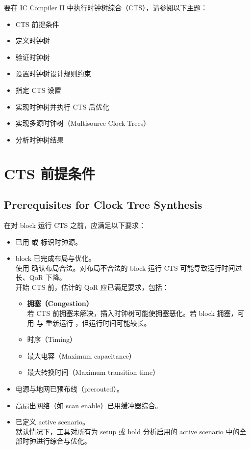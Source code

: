 \label{chap:cts}

要在 IC Compiler II 中执行时钟树综合（CTS），请参阅以下主题：
\begin{itemize}
  \item CTS 前提条件
  \item 定义时钟树
  \item 验证时钟树
  \item 设置时钟树设计规则约束
  \item 指定 CTS 设置
  \item 实现时钟树并执行 CTS 后优化
  \item 实现多源时钟树（Multisource Clock Trees）
  \item 分析时钟树结果
\end{itemize}

\section{CTS 前提条件}
\subsection*{Prerequisites for Clock Tree Synthesis}

在对 block 运行 CTS 之前，应满足以下要求：
\begin{itemize}
  \item 已用  或  标识时钟源。
  \item block 已完成布局与优化。\\
        使用  确认布局合法。对布局不合法的 block 运行 CTS 可能导致运行时间过长、QoR 下降。\\
        开始 CTS 前，估计的 QoR 应已满足要求，包括：
        \begin{itemize}
          \item \textbf{拥塞（Congestion）}\\
                若 CTS 前拥塞未解决，插入时钟树可能使拥塞恶化。若 block 拥塞，可用  与  重新运行 ，但运行时间可能较长。
          \item 时序（Timing）
          \item 最大电容（Maximum capacitance）
          \item 最大转换时间（Maximum transition time）
        \end{itemize}
  \item 电源与地网已预布线（prerouted）。
  \item 高扇出网络（如 scan enable）已用缓冲器综合。
  \item 已定义 active scenario。\\
        默认情况下，工具对所有为 setup 或 hold 分析启用的 active scenario 中的全部时钟进行综合与优化。
\end{itemize}

